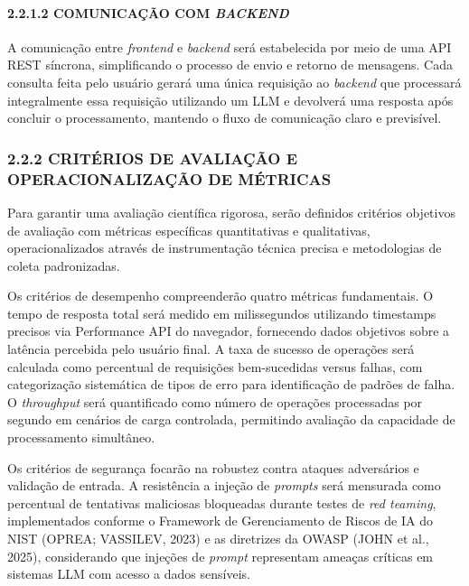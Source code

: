 \documentclass[
]{article}
\begin{document}
\paragraph{\texorpdfstring{2.2.1.2 COMUNICAÇÃO COM
\emph{BACKEND}}{2.2.1.2 COMUNICAÇÃO COM BACKEND}}\label{comunicauxe7uxe3o-com-backend}

A comunicação entre \emph{frontend} e \emph{backend} será estabelecida
por meio de uma API REST síncrona, simplificando o processo de envio e
retorno de mensagens. Cada consulta feita pelo usuário gerará uma única
requisição ao \emph{backend} que processará integralmente essa
requisição utilizando um LLM e devolverá uma resposta após concluir o
processamento, mantendo o fluxo de comunicação claro e previsível.

\subsubsection{2.2.2 CRITÉRIOS DE AVALIAÇÃO E OPERACIONALIZAÇÃO DE
MÉTRICAS}\label{crituxe9rios-de-avaliauxe7uxe3o-e-operacionalizauxe7uxe3o-de-muxe9tricas}

Para garantir uma avaliação científica rigorosa, serão definidos
critérios objetivos de avaliação com métricas específicas quantitativas
e qualitativas, operacionalizados através de instrumentação técnica
precisa e metodologias de coleta padronizadas.

Os critérios de desempenho compreenderão quatro métricas fundamentais. O
tempo de resposta total será medido em milissegundos utilizando
timestamps precisos via Performance API do navegador, fornecendo dados
objetivos sobre a latência percebida pelo usuário final. A taxa de
sucesso de operações será calculada como percentual de requisições
bem-sucedidas versus falhas, com categorização sistemática de tipos de
erro para identificação de padrões de falha. O \emph{throughput} será
quantificado como número de operações processadas por segundo em
cenários de carga controlada, permitindo avaliação da capacidade de
processamento simultâneo.

Os critérios de segurança focarão na robustez contra ataques adversários
e validação de entrada. A resistência a injeção de \emph{prompts} será
mensurada como percentual de tentativas maliciosas bloqueadas durante
testes de \emph{red teaming}, implementados conforme o Framework de
Gerenciamento de Riscos de IA do NIST (OPREA; VASSILEV, 2023) e as
diretrizes da OWASP (JOHN et al., 2025), considerando que injeções de
\emph{prompt} representam ameaças críticas em sistemas LLM com acesso a
dados sensíveis.
\end{document}
